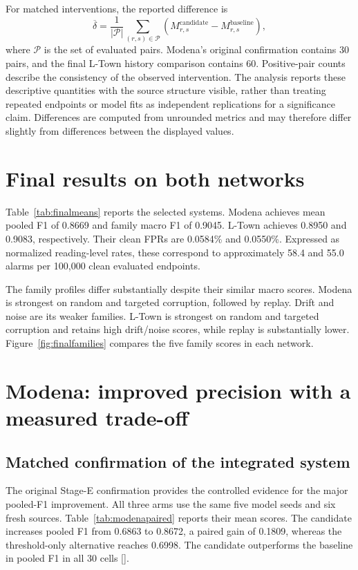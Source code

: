 For matched interventions, the reported difference is
\begin{equation}
 \overline\delta=\frac{1}{|\mathcal P|}\sum_{(r,s)\in\mathcal P}
 \left(M^{\mathrm{candidate}}_{r,s}-M^{\mathrm{baseline}}_{r,s}\right),
 \label{eq:paireddifference}
\end{equation}
where $\mathcal P$ is the set of evaluated pairs. Modena's original confirmation contains 30 pairs, and the final L-Town history comparison contains 60. Positive-pair counts describe the consistency of the observed intervention. The analysis reports these descriptive quantities with the source structure visible, rather than treating repeated endpoints or model fits as independent replications for a significance claim. Differences are computed from unrounded metrics and may therefore differ slightly from differences between the displayed values.

\section{Final results on both networks}

Table~\ref{tab:finalmeans} reports the selected systems. Modena achieves mean pooled F1 of 0.8669 and family macro F1 of 0.9045. L-Town achieves 0.8950 and 0.9083, respectively. Their clean FPRs are 0.0584\% and 0.0550\%. Expressed as normalized reading-level rates, these correspond to approximately 58.4 and 55.0 alarms per 100,000 clean evaluated endpoints.

The family profiles differ substantially despite their similar macro scores. Modena is strongest on random and targeted corruption, followed by replay. Drift and noise are its weaker families. L-Town is strongest on random and targeted corruption and retains high drift/noise scores, while replay is substantially lower. Figure~\ref{fig:finalfamilies} compares the five family scores in each network.


\FloatBarrier
\section{Modena: improved precision with a measured trade-off}
\subsection{Matched confirmation of the integrated system}
The original Stage-E confirmation provides the controlled evidence for the major pooled-F1 improvement. All three arms use the same five model seeds and six fresh sources. Table~\ref{tab:modenapaired} reports their mean scores. The candidate increases pooled F1 from 0.6863 to 0.8672, a paired gain of 0.1809, whereas the threshold-only alternative reaches 0.6998. The candidate outperforms the baseline in pooled F1 in all 30 cells [].

